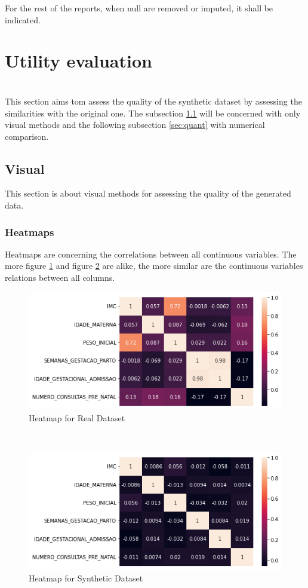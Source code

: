 \documentclass{article}
\begin{document}
For the rest of the reports, when null are removed or imputed, it shall be indicated.
\section{Utility evaluation}\\
This section aims tom assess the quality of the synthetic dataset by assessing the similarities with the original one. The subsection \ref{sec:visual} will be concerned with only visual methods and the following subsection \ref{sec:quant} with numerical comparison.\\
\subsection{Visual}  \label{sec:visual}
This section is about visual methods for assessing the quality of the generated data.\\
\subsubsection{Heatmaps}
Heatmaps are concerning the correlations between all continuous variables. The more figure \ref{fig:heatmapreal} and figure \ref{fig:heatmapsynth} are alike, the more similar are the continuous variables relations between all columns. 

\begin{figure}[h!]
\centering
\includegraphics[width=120mm]{heatmap_real}
\caption{Heatmap for Real  Dataset}
\label{fig:heatmapreal}
\end{figure}
\\

\begin{figure}[h!]
\centering
\includegraphics[width=120mm]{heatmap_synth}
\caption{Heatmap for Synthetic Dataset}
\label{fig:heatmapsynth}
\end{figure}
\end{document}
